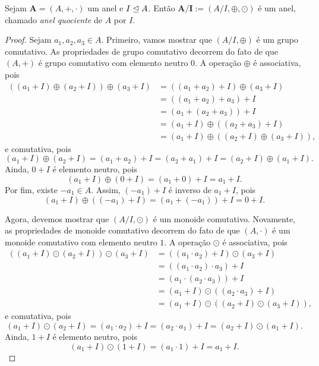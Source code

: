 \begin{proposition}
	Sejam $\bm A=(A,+,\cdot)$ um anel e $I \mathrel{\unlhd} A$. Então $\bm{A/I} := (A/I,\oplus,\odot)$ é um anel, chamado \emph{anel quociente} de $A$ por $I$.
\end{proposition}
\begin{proof}
	Sejam $a_1,a_2,a_3 \in A$. Primeiro, vamos mostrar que $(A/I,\oplus)$ é um grupo comutativo. As propriedades de grupo comutativo decorrem do fato de que $(A,+)$ é grupo comutativo com elemento neutro $0$. A operação $\oplus$ é associativa, pois
	\begin{align*}
	((a_1+I) \oplus (a_2+I)) \oplus (a_3+I) &= ((a_1+a_2)+I) \oplus (a_3+I) \\
		&= ((a_1+a_2)+a_3)+I \\
		&= (a_1+(a_2+a_3))+I \\
		&= (a_1+I) \oplus ((a_2+a_3)+I) \\
		&= (a_1+I) \oplus ((a_2+I) \oplus (a_3+I)),
	\end{align*}
e comutativa, pois
	\begin{equation*}
	(a_1+I) \oplus (a_2+I) = (a_1+a_2)+I = (a_2+a_1)+I = (a_2+I) \oplus (a_1+I).
	\end{equation*}
Ainda, $0+I$ é elemento neutro, pois
	\begin{equation*}
	(a_1+I) \oplus (0+I) = (a_1+0)+I = a_1+I.
	\end{equation*}
Por fim, existe $-a_1 \in A$. Assim, $(-a_1)+I$ é inverso de $a_1+I$, pois
	\begin{equation*}
	(a_1+I) \oplus ((-a_1)+I) = (a_1+(-a_1))+I = 0+I.
	\end{equation*}

	Agora, devemos mostrar que $(A/I,\odot)$ é um monoide comutativo. Novamente, as propriedades de monoide comutativo decorrem do fato de que $(A,\cdot)$ é um monoide comutativo com elemento neutro $1$. A operação $\odot$ é associativa, pois
	\begin{align*}
	((a_1+I) \odot (a_2+I)) \odot (a_3+I) &= ((a_1 \cdot a_2)+I) \odot (a_3+I) \\
		&= ((a_1 \cdot a_2) \cdot a_3)+I \\
		&= (a_1 \cdot (a_2 \cdot a_3))+I \\
		&= (a_1+I) \odot ((a_2 \cdot a_3)+I) \\
		&= (a_1+I) \odot ((a_2+I) \odot (a_3+I)),
	\end{align*}
e comutativa, pois
	\begin{equation*}
	(a_1+I) \odot (a_2+I) = (a_1 \cdot a_2)+I = (a_2 \cdot a_1)+I = (a_2+I) \odot (a_1+I).
	\end{equation*}
Ainda, $1+I$ é elemento neutro, pois
	\begin{equation*}
	(a_1+I) \odot (1+I) = (a_1 \cdot 1)+I = a_1+I.
	\end{equation*}


\end{proof}
